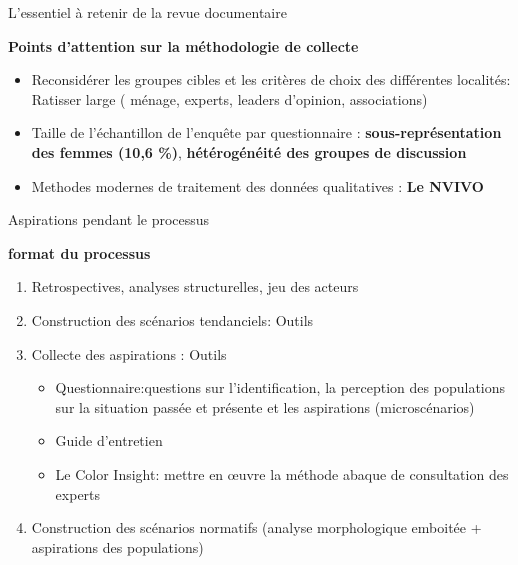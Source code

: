 \documentclass[11pt]{beamer}
\begin{document}
\begin{frame}{ L'essentiel à retenir de la revue documentaire}
\begin{block}{ \textbf{Points d'attention sur la méthodologie de collecte} }
\begin{itemize} [<+->]
  \item   Reconsidérer les  groupes cibles et les critères de choix des différentes localités: Ratisser large ( ménage,  experts, leaders d'opinion, associations)     \vfill
  \item   Taille de l’échantillon de l’enquête par questionnaire : \textbf{sous-représentation des femmes (10,6 \%)}, \textbf{hétérogénéité des groupes de discussion}     \vfill
   \item Methodes modernes de traitement des données qualitatives : \textbf{Le NVIVO}
  \end{itemize}
\end{block}
\end{frame}

\begin{frame}{ Aspirations pendant le processus}
\begin{exampleblock}{ \textbf{format du processus} }
     \begin{enumerate}  [<+->]
      \item    Retrospectives, analyses structurelles, jeu des acteurs \vfill  
      \item    Construction des scénarios tendanciels: Outils  \vfill
      \item    Collecte des aspirations : Outils  \vfill
            \begin{itemize} [<+->]
            \item   Questionnaire:questions sur l'identification, la perception des populations sur la situation passée et présente  et les aspirations (microscénarios) \vfill
            \item   Guide d’entretien
            \item   Le Color Insight: mettre en œuvre la méthode abaque de consultation des experts
            \end{itemize} 
      \item Construction des scénarios normatifs (analyse morphologique emboitée  + aspirations des populations)
     \end{enumerate}
\end{exampleblock}
\end{frame}
\end{document}
